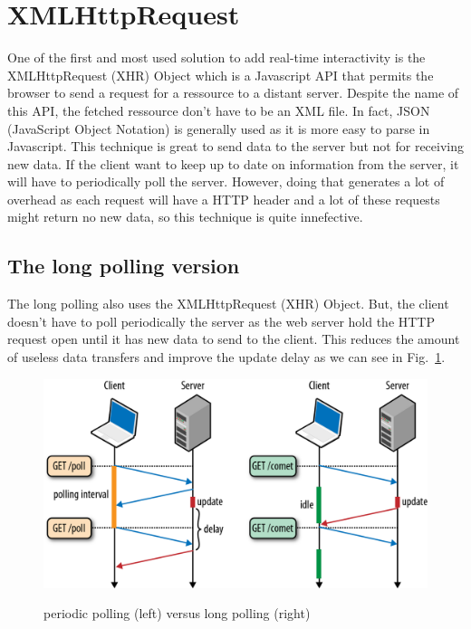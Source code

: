 \documentclass[journal,compsoc]{IEEEtran}
\begin{document}
\section{XMLHttpRequest}

One of the first and most used solution to add real-time interactivity is the XMLHttpRequest (XHR) Object which is a Javascript API that permits the browser to send a request for a ressource to a distant server.
Despite the name of this API, the fetched ressource don't have to be an XML file.
In fact, JSON (JavaScript Object Notation) is generally used as it is more easy to parse in Javascript.
This technique is great to send data to the server but not for receiving new data.
If the client want to keep up to date on information from the server, it will have to periodically poll the server.
However, doing  that generates a lot of overhead as each request will have a HTTP header and a lot of these requests might return no new data, so this technique is quite innefective.

\subsection{The long polling version}

The long polling also uses the XMLHttpRequest (XHR) Object. 
But, the client doesn't have to poll periodically the server as the web server hold the HTTP request open until it has new data to send to the client.
This reduces the amount of useless data transfers and improve the update delay as we can see in Fig.~\ref{poll_vs_lpoll}.

\begin{figure}
  \centering
  \includegraphics[width=\linewidth]{poll_vs_lpoll}
  \label{poll_vs_lpoll}
  \caption{periodic polling (left) versus long polling (right)}
\end{figure}
\end{document}

